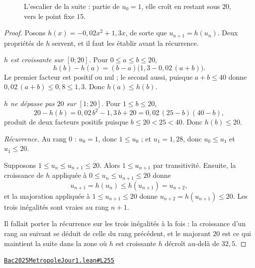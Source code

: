 \documentclass[11pt,a4paper]{article}
\theoremstyle{definition}
\theoremstyle{plain}
\theoremstyle{definition}
\newcommand{\source}[2]{\par\smallskip\noindent\hfill{\footnotesize\href{#1}{\texttt{#2}}}\par\smallskip}
\begin{document}
\begin{figure}[h]
\centering

\caption{L'escalier de la suite : partie de \(u_0 = 1\), elle croît en restant sous \(20\), vers le point fixe \(15\).}
\end{figure}
\begin{proof}
Posons $h(x) = -0{,}02x^2 + 1{,}3x$, de sorte que $u_{n+1} = h(u_n)$. Deux propriétés de
$h$ servent, et il faut les établir avant la récurrence.

\emph{$h$ est croissante sur $[0 ; 20]$.} Pour $0 \le a \le b \le 20$,
\[ h(b) - h(a) = (b - a)\bigl(1{,}3 - 0{,}02\,(a + b)\bigr) . \]
Le premier facteur est positif ou nul ; le second aussi, puisque $a + b \le 40$ donne
$0{,}02\,(a+b) \le 0{,}8 \le 1{,}3$. Donc $h(a) \le h(b)$.

\emph{$h$ ne dépasse pas $20$ sur $[1 ; 20]$.} Pour $1 \le b \le 20$,
\[ 20 - h(b) = 0{,}02\,b^2 - 1{,}3\,b + 20 = 0{,}02\,(25 - b)(40 - b) , \]
produit de deux facteurs positifs puisque $b \le 20 < 25 < 40$. Donc $h(b) \le 20$.

\emph{Récurrence.} Au rang $0$ : $u_0 = 1$, donc $1 \le u_0$ ; et $u_1 = 1{,}28$, donc
$u_0 \le u_1$ et $u_1 \le 20$.

Supposons $1 \le u_n \le u_{n+1} \le 20$. Alors $1 \le u_{n+1}$ par transitivité. Ensuite,
la croissance de $h$ appliquée à $0 \le u_n \le u_{n+1} \le 20$ donne
\[ u_{n+1} = h(u_n) \le h(u_{n+1}) = u_{n+2} , \]
et la majoration appliquée à $1 \le u_{n+1} \le 20$ donne $u_{n+2} = h(u_{n+1}) \le 20$.
Les trois inégalités sont vraies au rang $n+1$.

Il fallait porter la récurrence sur les trois inégalités à la fois : la croissance d'un
rang au suivant se déduit de celle du rang précédent, et le majorant $20$ est ce qui
maintient la suite dans la zone où $h$ est croissante \textemdash{} $h$ décroît au-delà de
$32{,}5$.
\end{proof}
\source{https://github.com/Commutator-IO/learn-lean/blob/main/exams/2025/Bac2025MetropoleJour1.lean\#L255}{Bac2025MetropoleJour1.lean\#L255}
\end{document}
